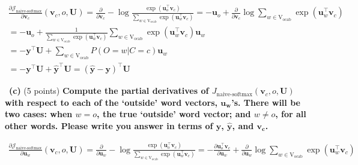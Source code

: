 \documentclass[a4 paper]{article}
\newcommand{\subproblem}[1]{~\newline\textbf{(#1)}}
\newcommand{\bb}[1]{$\boldsymbol{#1}$}
\begin{document}
\begin{equation}
    \begin{aligned}
        \frac{\partial \mathcal J_{\text {naive-softmax}}}{\partial \boldsymbol{v}_c}
        \left(\boldsymbol{v}_{c}, o, \boldsymbol{U}\right)
        = \frac{\partial}{\partial \boldsymbol{v}_c} -\log \frac{\exp \left(\boldsymbol{u}_{o}^{\top} \boldsymbol{v}_{c}\right)}{\sum_{w \in \mathrm{V_{ocab}}} \exp \left(\boldsymbol{u}_{w}^{\top} \boldsymbol{v}_{c}\right)}
        = -\boldsymbol{u}_{o} + \frac{\partial}{\partial \boldsymbol{v}_c} \log \sum_{w \in \mathrm{V_{ocab}}} \exp \left(\boldsymbol{u}_{w}^{\top} \boldsymbol{v}_{c}\right) \\
        = -\boldsymbol{u}_{o} + \frac{1}{\sum_{w \in \mathrm{V_{ocab}}} \exp \left(\boldsymbol{u}_{w}^{\top} \boldsymbol{v}_{c}\right)} \sum_{w \in \mathrm{V_{ocab}}} \exp \left(\boldsymbol{u}_{w}^{\top} \boldsymbol{v}_{c}\right) \boldsymbol{u}_{w} \\
        = -\boldsymbol{y}^\top\boldsymbol{U} + \sum_{w \in \mathrm{V_{ocab}}} P(O=w | C=c) \boldsymbol{u}_{w} \\
        = -\boldsymbol{y}^\top\boldsymbol{U} + \boldsymbol{\hat{y}}^\top\boldsymbol{U}
        = (\boldsymbol{\hat{y}}-\boldsymbol{y})^\top \boldsymbol{U}
    \end{aligned}
\end{equation}

\subproblem{c} (5 points) \textbf{Compute the partial derivatives of $J_{\text {naive-softmax}}\left(\boldsymbol{v}_{c}, o, \boldsymbol{U}\right)$ with respect to each of the `outside' word vectors, \bb{u_w}’s.
There will be two cases: when $w = o$, the true `outside' word vector; and $w\neq o$, for all other words.
Please write you answer in terms of \bb{y}, \bb{\hat{y}}, and \bb{v_c}.}

\begin{equation}
    \begin{aligned}
        \frac{\partial \mathcal J_{\text {naive-softmax}}}{\partial \boldsymbol{u}_w}
        \left(\boldsymbol{v}_{c}, o, \boldsymbol{U}\right)
        = \frac{\partial}{\partial \boldsymbol{u}_w} -\log \frac{\exp \left(\boldsymbol{u}_{o}^{\top} \boldsymbol{v}_{c}\right)}{\sum_{w \in \mathrm{V_{ocab}}} \exp \left(\boldsymbol{u}_{w}^{\top} \boldsymbol{v}_{c}\right)}
        = -\frac{\partial \boldsymbol{u}_{o}^{\top} \boldsymbol{v}_{c}}{\partial \boldsymbol{u}_w} + \frac{\partial}{\partial \boldsymbol{u}_w} \log \sum_{w \in \mathrm{V_{ocab}}} \exp \left(\boldsymbol{u}_{w}^{\top} \boldsymbol{v}_{c}\right)
    \end{aligned}
\end{equation}
\end{document}
